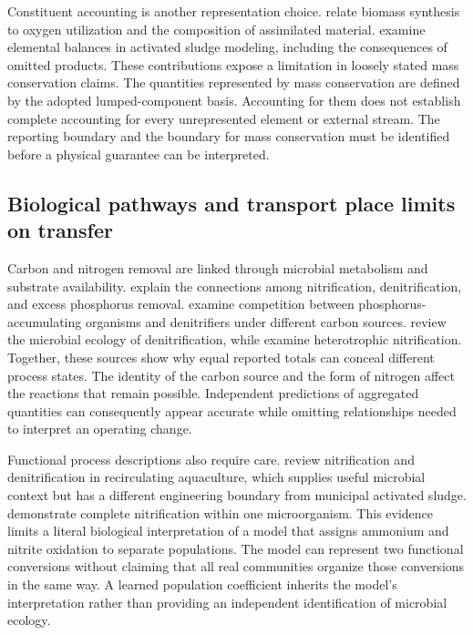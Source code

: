 Constituent accounting is another representation choice. \citet{Hoover1952} relate biomass synthesis to oxygen utilization and the composition of assimilated material. \citet{TakacsVanrolleghem2006} examine elemental balances in activated sludge modeling, including the consequences of omitted products. These contributions expose a limitation in loosely stated mass conservation claims. The quantities represented by mass conservation are defined by the adopted lumped-component basis. Accounting for them does not establish complete accounting for every unrepresented element or external stream. The reporting boundary and the boundary for mass conservation must be identified before a physical guarantee can be interpreted.

\subsection{Biological pathways and transport place limits on transfer}

Carbon and nitrogen removal are linked through microbial metabolism and substrate availability. \citet{Wentzel1992} explain the connections among nitrification, denitrification, and excess phosphorus removal. \citet{Guerrero2011} examine competition between phosphorus-accumulating organisms and denitrifiers under different carbon sources. \citet{Lu2014} review the microbial ecology of denitrification, while \citet{Duan2022} examine heterotrophic nitrification. Together, these sources show why equal reported totals can conceal different process states. The identity of the carbon source and the form of nitrogen affect the reactions that remain possible. Independent predictions of aggregated quantities can consequently appear accurate while omitting relationships needed to interpret an operating change.

Functional process descriptions also require care. \citet{Preena2021} review nitrification and denitrification in recirculating aquaculture, which supplies useful microbial context but has a different engineering boundary from municipal activated sludge. \citet{VanKessel2015} demonstrate complete nitrification within one microorganism. This evidence limits a literal biological interpretation of a model that assigns ammonium and nitrite oxidation to separate populations. The model can represent two functional conversions without claiming that all real communities organize those conversions in the same way. A learned population coefficient inherits the model's interpretation rather than providing an independent identification of microbial ecology.

